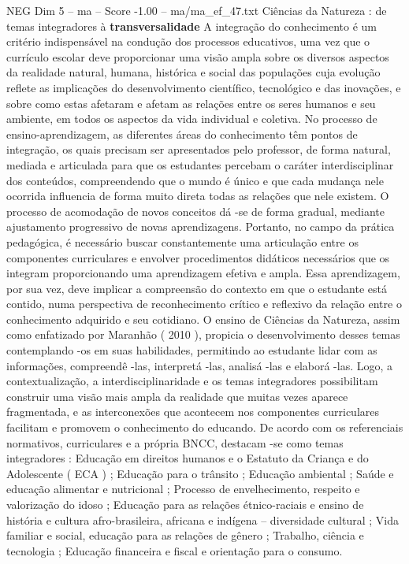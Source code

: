 \begin{textsample}{NEG Dim 5 – ma – Score -1.00 – ma/ma\_ef\_47.txt}  \label{ex:f5_neg_118}
Ciências da Natureza : de temas integradores à \textbf{transversalidade} A integração do conhecimento é um critério indispensável na condução dos processos educativos, uma vez que o currículo escolar deve proporcionar uma visão ampla sobre os diversos aspectos da realidade natural, humana, histórica e social das populações cuja evolução reflete as implicações do desenvolvimento científico, tecnológico e das inovações, e sobre como estas afetaram e afetam as relações entre os seres humanos e seu ambiente, em todos os aspectos da vida individual e coletiva.
No processo de ensino-aprendizagem, as diferentes áreas do conhecimento têm pontos de integração, os quais precisam ser apresentados pelo professor, de forma natural, mediada e articulada para que os estudantes percebam o caráter interdisciplinar dos conteúdos, compreendendo que o mundo é único e que cada mudança nele ocorrida influencia de forma muito direta todas as relações que nele existem.
O processo de acomodação de novos conceitos dá -se de forma gradual, mediante ajustamento progressivo de novas aprendizagens.
Portanto, no campo da prática pedagógica, é necessário buscar constantemente uma articulação entre os componentes curriculares e envolver procedimentos didáticos necessários que os integram proporcionando uma aprendizagem efetiva e ampla.
Essa aprendizagem, por sua vez, deve implicar a compreensão do contexto em que o estudante está contido, numa perspectiva de reconhecimento crítico e reflexivo da relação entre o conhecimento adquirido e seu cotidiano.
O ensino de Ciências da Natureza, assim como enfatizado por Maranhão ( 2010 ), propicia o desenvolvimento desses temas contemplando -os em suas habilidades, permitindo ao estudante lidar com as informações, compreendê -las, interpretá -las, analisá -las e elaborá -las.
Logo, a contextualização, a interdisciplinaridade e os temas integradores possibilitam construir uma visão mais ampla da realidade que muitas vezes aparece fragmentada, e as interconexões que acontecem nos componentes curriculares facilitam e promovem o conhecimento do educando.
De acordo com os referenciais normativos, curriculares e a própria BNCC, destacam -se como temas integradores : Educação em direitos humanos e o Estatuto da Criança e do Adolescente ( ECA ) ; Educação para o trânsito ; Educação ambiental ; Saúde e educação alimentar e nutricional ; Processo de envelhecimento, respeito e valorização do idoso ; Educação para as relações étnico-raciais e ensino de história e cultura afro-brasileira, africana e indígena – diversidade cultural ; Vida familiar e social, educação para as relações de gênero ; Trabalho, ciência e tecnologia ; Educação financeira e fiscal e orientação para o consumo.

\end{textsample}
